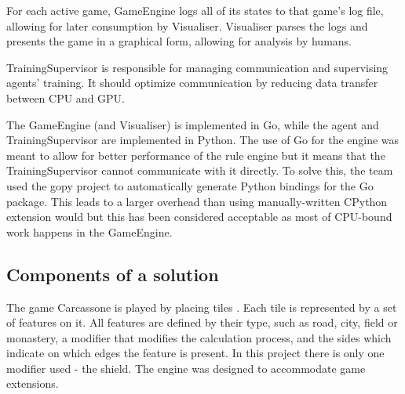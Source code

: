 For each active game, GameEngine logs all of its states to that game's log file,
allowing for later consumption by Visualiser. Visualiser parses the logs
and presents the game in a graphical form, allowing for analysis by humans.

TrainingSupervisor is responsible for managing communication and supervising agents' training.
It should optimize communication by reducing data transfer between CPU and GPU.

The GameEngine (and Visualiser) is implemented in Go, while the agent and TrainingSupervisor
are implemented in Python. The use of Go for the engine was meant to allow for better performance of
the rule engine but it means that the TrainingSupervisor cannot communicate with it directly.
To solve this, the team used the gopy project \cite{gopy} to automatically generate
Python bindings \cite{LanguageBindings} for the Go package. This leads to a larger overhead than
using manually-written CPython extension would but this has been considered acceptable as most of
CPU-bound work happens in the GameEngine.

\subsection{Components of a solution}

The game Carcassone is played by placing tiles \cite{CarcassoneRules}. Each tile is represented by a set of features on it. All features are defined by their type, such as road, city, field or monastery, a modifier that modifies the calculation process, and the sides which indicate on which edges the feature is present. In this project there is only one modifier used - the shield. The engine was designed to accommodate game extensions. 

